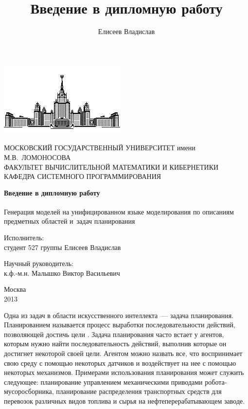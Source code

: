 \documentclass[a4paper,14pt]{extreport}
\title{Введение в дипломную работу}
\author{Елисеев Владислав}
\begin{document}
\begin{titlepage}

\begin{center}

\includegraphics[width=0.3\linewidth]{msu_title}

{\small
МОСКОВСКИЙ ГОСУДАРСТВЕННЫЙ УНИВЕРСИТЕТ имени М.В.~ЛОМОНОСОВА \\
ФАКУЛЬТЕТ ВЫЧИСЛИТЕЛЬНОЙ МАТЕМАТИКИ И КИБЕРНЕТИКИ \\
КАФЕДРА СИСТЕМНОГО ПРОГРАММИРОВАНИЯ
}
\end{center}

\vfill
\vfill
\begin{center}
\Large{\textbf{Введение в дипломную работу}} \\
~\\
\Large{Генерация моделей на унифицированном языке моделирования по описаниям предметных областей и~задач планирования}
\end{center}
\vfill
\vfill
\vfill
\vfill
\begin{flushright}
Исполнитель: \\
студент 527 группы Елисеев Владислав
\end{flushright}
\vfill
\begin{flushright}
Научный руководитель: \\
к.ф.-м.н. Малышко Виктор Васильевич
\end{flushright}
  
\vfill
\vfill
\vfill
\vfill
\begin{center}
  Москва\\
  2013
\end{center}  
\end{titlepage}


\setcounter{page}{1}
\linespread{1.25}
\normalsize

	Одна из задач в области искусственного интеллекта~--- задача планирования. Планированием называется процесс выработки последовательности действий, позволяющей достичь цели \cite{norwig-ai}. Задача планирования часто встает у агентов, которым нужно найти последовательность действий, выполнив которые он достигнет некоторой своей цели. Агентом можно назвать все, что воспринимает свою среду с помощью некоторых датчиков и воздействует на нее с помощью некоторых механизмов. Примерами использования планирования может служить следующее: планирование управлением механическими приводами робота-мусоросборника, планирование распределения транспортных средств для перевозок различных видов топлива и сырья на нефтеперерабатывающем заводе. 
\end{document}
